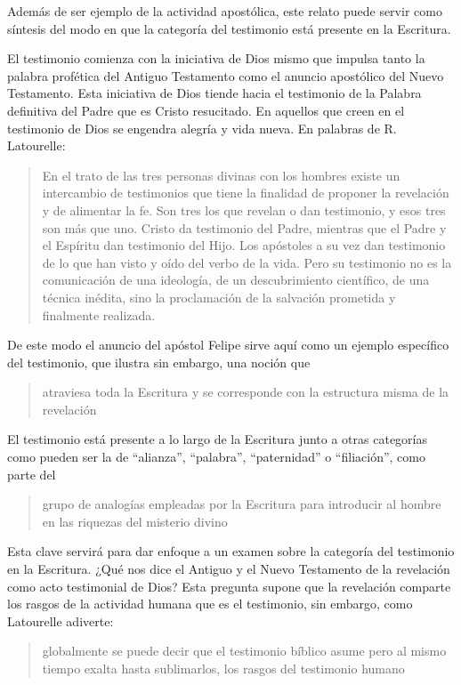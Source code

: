 Además de ser ejemplo de la actividad apostólica, este relato puede servir como
síntesis del modo en que la categoría del testimonio está presente en la
Escritura.

El testimonio comienza con la iniciativa de Dios mismo que impulsa tanto la
palabra profética del Antiguo Testamento como el anuncio apostólico del Nuevo
Testamento. Esta iniciativa de Dios tiende hacia el testimonio de la Palabra
definitiva del Padre que es Cristo resucitado. En aquellos que creen en el
testimonio de Dios se engendra alegría y vida nueva. En palabras de R.
Latourelle:
\blockquote[{\cite[1531]{latourelle2000testimonio}}]{En el trato de las tres
  personas divinas con los hombres existe un intercambio de testimonios que
  tiene la finalidad de proponer la revelación y de alimentar la fe. Son tres
  los que revelan o dan testimonio, y esos tres son más que uno. Cristo da
  testimonio del Padre, mientras que el Padre y el Espíritu dan testimonio del
  Hijo. Los apóstoles a su vez dan testimonio de lo que han visto y oído del
  verbo de la vida. Pero su testimonio no es la comunicación de una ideología,
  de un descubrimiento científico, de una técnica inédita, sino la proclamación
  de la salvación prometida y finalmente realizada.}

De este modo el anuncio del apóstol Felipe sirve aquí como un ejemplo específico
del testimonio, que ilustra sin embargo, una noción que
\blockquote[{\cite[109]{prades2015testimonio}}]{atraviesa toda la Escritura y se
  corresponde con la estructura misma de la revelación}. El testimonio está
presente a lo largo de la Escritura junto a otras categorías como pueden ser la
de \enquote{alianza}, \enquote{palabra}, \enquote{paternidad} o
\enquote{filiación}, como parte del
\blockquote[{\cite[1523]{latourelle2000testimonio}}]{grupo de analogías
  empleadas por la Escritura para introducir al hombre en las riquezas del
  misterio divino}.

Esta clave servirá para dar enfoque a un examen sobre la categoría del
testimonio en la Escritura. ¿Qué nos dice el Antiguo y el Nuevo Testamento de la
revelación como acto testimonial de Dios? Esta pregunta supone que la revelación
comparte los rasgos de la actividad humana que es el testimonio, sin embargo,
como Latourelle adiverte:
\blockquote[{\cite[1526]{latourelle2000testimonio}}]{globalmente se puede decir
  que el testimonio bíblico asume pero al mismo tiempo exalta hasta sublimarlos,
  los rasgos del testimonio humano}.

